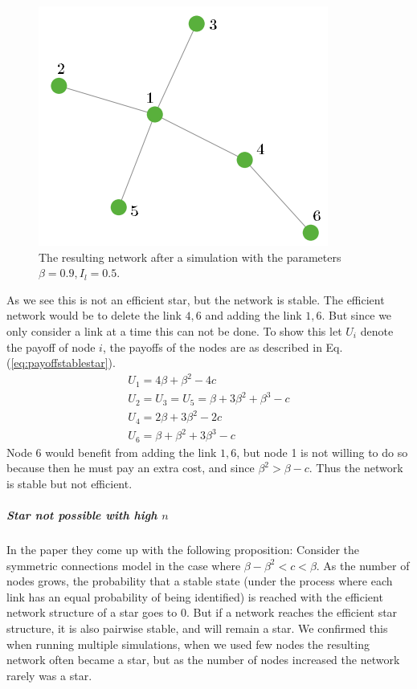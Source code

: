 \begin{figure}[h]
\centering
  \includegraphics[width=0.5\linewidth]{../Figures/stability/Unefficientbutstablestar.png}
  \caption{\label{fig:stablestar} The resulting network after a simulation with the parameters $\beta=0.9, I_{l}=0.5$.}
\end{figure}
As we see this is not an efficient star, but the network is stable. The efficient network would be to delete the link $4,6$ and adding the link $1,6$. But since we only consider a link at a time this can not be done. To show this let $U_{i}$ denote the payoff of node $i$, the payoffs of the nodes are as described in Eq.(\ref{eq:payoffstablestar}).
\begin{eqnarray}
U_{1}=4\beta+\beta^2-4c\\
U_{2}=U_{3}=U_{5}=\beta+3\beta^2+\beta^3-c\\
U_{4}=2\beta+3\beta^2-2c\\
U_{6}=\beta+\beta^2+3\beta^3-c
\label{eq:payoffstablestar}
\end{eqnarray}
Node $6$ would benefit from adding the link $1,6$, but node 1 is not willing to do so because then he must pay an extra cost, and since $\beta^2>\beta-c$. Thus the network is stable but not efficient. 

\subparagraph{Star not possible with high $n$}
In the paper \cite{jackson2005survey} they come up with the following proposition:
Consider the symmetric connections model in the case where $\beta-\beta^2<c<\beta$. As the number of nodes grows, the probability that a stable state (under the process where each link has an equal probability of being identified) is reached with the efficient network structure of a star goes to 0. But if a network reaches the efficient star structure, it is also pairwise stable, and will remain a star. 
We confirmed this when running multiple simulations, when we used few nodes the resulting network often became a star, but as the number of nodes increased the network rarely was a star. 

